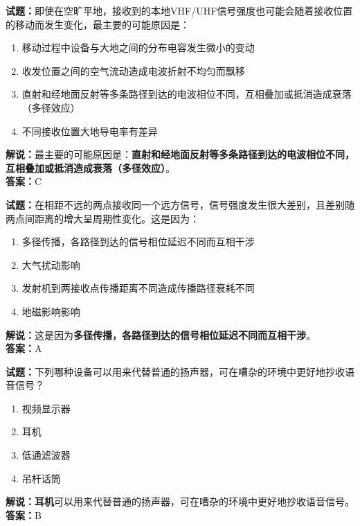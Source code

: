 \documentclass{ctexbook}
\begin{document}
\bigskip


\noindent\textbf{试题：}即使在空旷平地，接收到的本地VHF/UHF信号强度也可能会随着接收位置的移动而发生变化，最主要的可能原因是：
\begin{enumerate}[leftmargin=3em]
\item 移动过程中设备与大地之间的分布电容发生微小的变动
\item 收发位置之间的空气流动造成电波折射不均匀而飘移
\item 直射和经地面反射等多条路径到达的电波相位不同，互相叠加或抵消造成衰落（多径效应）
\item 不同接收位置大地导电率有差异
\end{enumerate}
\noindent\textbf{解说：}最主要的可能原因是：\textbf{直射和经地面反射等多条路径到达的电波相位不同，互相叠加或抵消造成衰落（多径效应）}。\\\noindent\textbf{答案：}C




\bigskip


\noindent\textbf{试题：}在相距不远的两点接收同一个远方信号，信号强度发生很大差别，且差别随两点间距离的增大呈周期性变化。这是因为：
\begin{enumerate}[leftmargin=3em]
\item 多径传播，各路径到达的信号相位延迟不同而互相干涉
\item 大气扰动影响
\item 发射机到两接收点传播距离不同造成传播路径衰耗不同
\item 地磁影响影响
\end{enumerate}
\noindent\textbf{解说：}这是因为\textbf{多径传播，各路径到达的信号相位延迟不同而互相干涉}。\\\noindent\textbf{答案：}A



\bigskip


\noindent\textbf{试题：}下列哪种设备可以用来代替普通的扬声器，可在嘈杂的环境中更好地抄收语音信号？
\begin{enumerate}[leftmargin=3em]
\item 视频显示器
\item 耳机
\item 低通滤波器
\item 吊杆话筒
\end{enumerate}
\noindent\textbf{解说：耳机}可以用来代替普通的扬声器，可在嘈杂的环境中更好地抄收语音信号。\\\noindent\textbf{答案：}B



\bigskip
\end{document}
